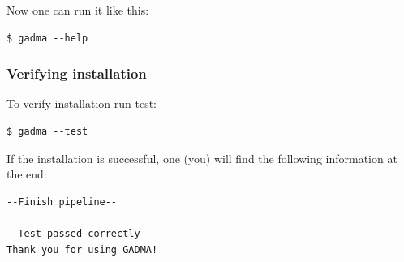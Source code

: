 \documentclass[12pt]{article}
\begin{document}
Now one can run it like this:
\begin{lstlisting}
$ gadma --help
\end{lstlisting}

\subsubsection{Verifying installation}
To verify installation run test:

\begin{lstlisting}
$ gadma --test
\end{lstlisting}

If the installation is successful, one (you) will find the following information at the end:
\begin{lstlisting}
--Finish pipeline--

--Test passed correctly--
Thank you for using GADMA!
\end{lstlisting}
\end{document}
